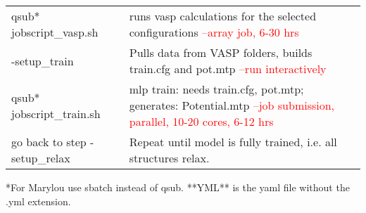\documentclass{article}
\begin{document}
\begin{center}
\begin{longtable}{||p{4cm}|p{7cm}||}
    qsub* jobscript\_vasp.sh & runs vasp calculations for
                                           the selected configurations
                                            \textcolor{red}{--array
                                            job, 6-30 hrs}\\
    -setup\_train & Pulls data from VASP folders, builds
                    train.cfg and pot.mtp \textcolor{red}{--run interactively} \\
    qsub* jobscript\_train.sh & mlp train: needs train.cfg, pot.mtp;
                                generates: Potential.mtp \textcolor{red}{--job
                    submission, parallel, 10-20 cores, 6-12 hrs}\\
   go back to step -setup\_relax & Repeat until model is fully
                                    trained, i.e. all structures relax.\\
  \end{longtable}
\end{center}
*For Marylou use sbatch instead of qsub.
**YML** is the yaml file without the .yml extension.
    
\end{document}
